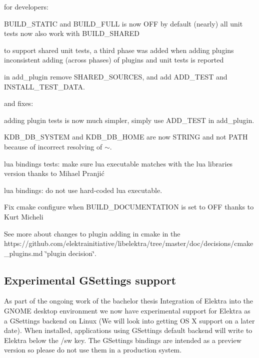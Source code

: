 for developers\+:


\begin{DoxyItemize}
\item B\+U\+I\+L\+D\+\_\+\+S\+T\+A\+T\+I\+C and B\+U\+I\+L\+D\+\_\+\+F\+U\+L\+L is now O\+F\+F by default (nearly) all unit tests now also work with B\+U\+I\+L\+D\+\_\+\+S\+H\+A\+R\+E\+D
\item to support shared unit tests, a third phase was added when adding plugins inconsistent adding (across phases) of plugins and unit tests is reported
\item in {\ttfamily add\+\_\+plugin} remove S\+H\+A\+R\+E\+D\+\_\+\+S\+O\+U\+R\+C\+E\+S, and add {\ttfamily A\+D\+D\+\_\+\+T\+E\+S\+T} and {\ttfamily I\+N\+S\+T\+A\+L\+L\+\_\+\+T\+E\+S\+T\+\_\+\+D\+A\+T\+A}.
\end{DoxyItemize}

and fixes\+:


\begin{DoxyItemize}
\item adding plugin tests is now much simpler, simply use {\ttfamily A\+D\+D\+\_\+\+T\+E\+S\+T} in {\ttfamily add\+\_\+plugin}.
\item K\+D\+B\+\_\+\+D\+B\+\_\+\+S\+Y\+S\+T\+E\+M and K\+D\+B\+\_\+\+D\+B\+\_\+\+H\+O\+M\+E are now S\+T\+R\+I\+N\+G and not P\+A\+T\+H because of incorrect resolving of {\ttfamily $\sim$}.
\item lua bindings tests\+: make sure lua executable matches with the lua libraries version thanks to Mihael Pranjić
\item lua bindings\+: do not use hard-\/coded {\ttfamily lua} executable.
\item Fix cmake configure when B\+U\+I\+L\+D\+\_\+\+D\+O\+C\+U\+M\+E\+N\+T\+A\+T\+I\+O\+N is set to O\+F\+F thanks to Kurt Micheli
\end{DoxyItemize}

See more about changes to plugin adding in cmake in the https\+://github.com/elektrainitiative/libelektra/tree/master/doc/decisions/cmake\+\_\+plugins.\+md \char`\"{}plugin decision\char`\"{}.

\subsection*{Experimental G\+Settings support}

As part of the ongoing work of the bachelor thesis {\ttfamily Integration of Elektra into the G\+N\+O\+M\+E desktop environment} we now have experimental support for Elektra as a G\+Settings backend on Linux (We will look into getting O\+S X support on a later date). When installed, applications using G\+Settings default backend will write to Elektra below the {\ttfamily /sw} key. The G\+Settings bindings are intended as a preview version so please do not use them in a production system.

